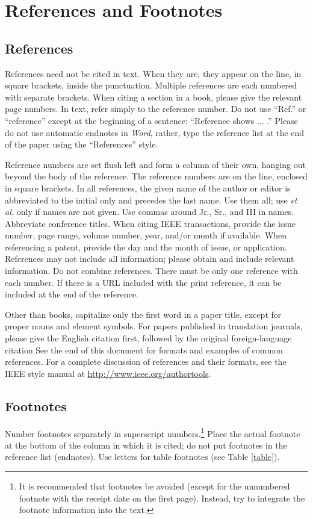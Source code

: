 \documentclass[journal,twoside,web]{ieeecolor}
\begin{document}
\section*{References and Footnotes}

\subsection{References}
References need not be cited in text. When they are, they appear on the 
line, in square brackets, inside the punctuation. Multiple references are 
each numbered with separate brackets. When citing a section in a book, 
please give the relevant page numbers. In text, refer simply to the 
reference number. Do not use ``Ref.'' or ``reference'' except at the 
beginning of a sentence: ``Reference \cite{b3} shows $\ldots$ .'' Please do not use 
automatic endnotes in \emph{Word}, rather, type the reference list at the end of the 
paper using the ``References'' style.

Reference numbers are set flush left and form a column of their own, hanging 
out beyond the body of the reference. The reference numbers are on the line, 
enclosed in square brackets. In all references, the given name of the author 
or editor is abbreviated to the initial only and precedes the last name. Use 
them all; use \emph{et al.} only if names are not given. Use commas around Jr., 
Sr., and III in names. Abbreviate conference titles. When citing IEEE 
transactions, provide the issue number, page range, volume number, year, 
and/or month if available. When referencing a patent, provide the day and 
the month of issue, or application. References may not include all 
information; please obtain and include relevant information. Do not combine 
references. There must be only one reference with each number. If there is a 
URL included with the print reference, it can be included at the end of the 
reference. 

Other than books, capitalize only the first word in a paper title, except 
for proper nouns and element symbols. For papers published in translation 
journals, please give the English citation first, followed by the original 
foreign-language citation See the end of this document for formats and 
examples of common references. For a complete discussion of references and 
their formats, see the IEEE style manual at
\underline{http://www.ieee.org/authortools}.

\subsection{Footnotes}
Number footnotes separately in superscript numbers.\footnote{It is recommended that footnotes be avoided (except for 
the unnumbered footnote with the receipt date on the first page). Instead, 
try to integrate the footnote information into the text.} Place the actual 
footnote at the bottom of the column in which it is cited; do not put 
footnotes in the reference list (endnotes). Use letters for table footnotes 
(see Table \ref{table}).
\end{document}
